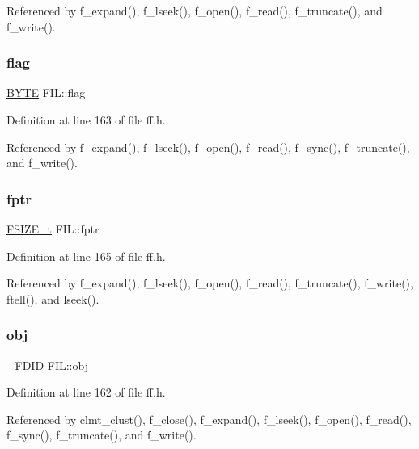 Referenced by f\+\_\+expand(), f\+\_\+lseek(), f\+\_\+open(), f\+\_\+read(), f\+\_\+truncate(), and f\+\_\+write().

\mbox{\label{structFIL_ac409508881f5a16f2998ae675072b376}} 
\subsubsection{\texorpdfstring{flag}{flag}}
{\footnotesize\ttfamily \hyperlink{integer_8h_a4ae1dab0fb4b072a66584546209e7d58}{B\+Y\+TE} F\+I\+L\+::flag}



Definition at line 163 of file ff.\+h.



Referenced by f\+\_\+expand(), f\+\_\+lseek(), f\+\_\+open(), f\+\_\+read(), f\+\_\+sync(), f\+\_\+truncate(), and f\+\_\+write().

\mbox{\label{structFIL_a088b03ab2e02f82e10e17bdd938190a6}} 
\subsubsection{\texorpdfstring{fptr}{fptr}}
{\footnotesize\ttfamily \hyperlink{ff_8h_a3fc0992ad7436250b6b1a0592214b7f2}{F\+S\+I\+Z\+E\+\_\+t} F\+I\+L\+::fptr}



Definition at line 165 of file ff.\+h.



Referenced by f\+\_\+expand(), f\+\_\+lseek(), f\+\_\+open(), f\+\_\+read(), f\+\_\+truncate(), f\+\_\+write(), ftell(), and lseek().

\mbox{\label{structFIL_ae7242545ea88ea2602484122ebe65fa3}} 
\subsubsection{\texorpdfstring{obj}{obj}}
{\footnotesize\ttfamily \hyperlink{struct__FDID}{\+\_\+\+F\+D\+ID} F\+I\+L\+::obj}



Definition at line 162 of file ff.\+h.



Referenced by clmt\+\_\+clust(), f\+\_\+close(), f\+\_\+expand(), f\+\_\+lseek(), f\+\_\+open(), f\+\_\+read(), f\+\_\+sync(), f\+\_\+truncate(), and f\+\_\+write().

